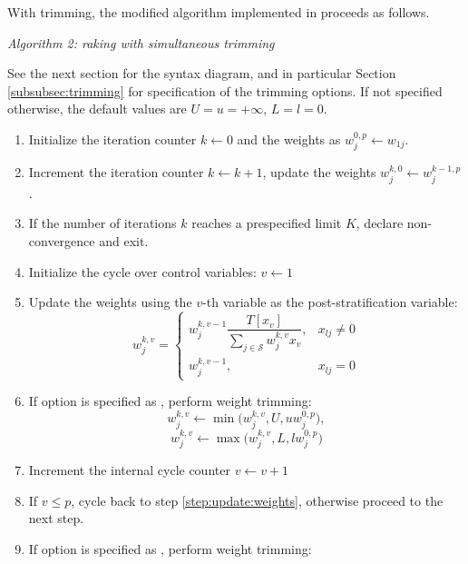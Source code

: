 With trimming, the modified algorithm implemented in
 proceeds as follows.

{\it Algorithm 2: raking with simultaneous trimming}

See the next section for the syntax diagram, and in particular
Section \ref{subsubsec:trimming} for specification of
the trimming options. If not specified otherwise, the default values
are $U=u=+\infty$, $L=l=0$.

\begin{enumerate}
    \item Initialize the iteration counter $k\leftarrow 0$
          and the weights as $w_j^{0,p} \leftarrow w_{1j}$.
    \item Increment the iteration counter $k \leftarrow k+1$,
          update the weights $w_j^{k,0} \leftarrow w_j^{k-1,p}$.
          \label{step:next:cycle}
    \item If the number of iterations $k$ reaches a prespecified limit $K$,
          declare non-convergence and exit.
    \item Initialize the cycle over control variables: $v \leftarrow 1$
    \item Update the weights using the $v$-th variable 
        as the post-stratification variable:
        $$
            w_j^{k,v} =
                \left\{
                \begin{array}{ll}
                    w_j^{k,v-1} \dfrac{ T[x_v] }{ \sum_{j \in \mathcal{S}} w_j^{k,v} x_v },
                        & x_{lj} \neq 0 \\
                    w_j^{k,v-1},
                        & x_{lj} = 0
                \end{array}
                \right.
          $$
          \label{step:update:weights}
    \item If  option is specified as ,
        perform weight trimming:
        $$
            w_j^{k,v} \leftarrow \min\bigl( w_j^{k,v}, U, u w_j^{0,p} \bigr),
        $$
        $$
            w_j^{k,v} \leftarrow \max\bigl( w_j^{k,v}, L, l w_j^{0,p} \bigr)
        $$
        \label{step:trimfreq:often}
    \item Increment the internal cycle counter $v \leftarrow v+1$
    \item If $v \le p$, cycle back to step \ref{step:update:weights},
        otherwise proceed to the next step.
    \item If  option is specified as ,
        perform weight trimming:

\end{enumerate}
